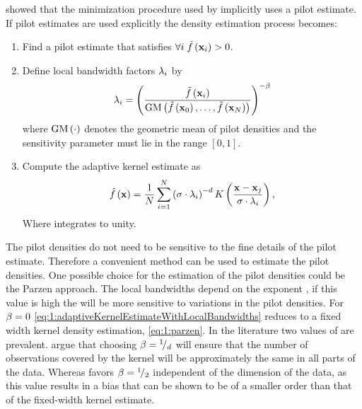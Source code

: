 	\textcite{silverman1986density} showed that the minimization procedure used by \citeauthor{breiman1977variable} implicitly uses a \KNN pilot estimate. If pilot estimates are used explicitly the density estimation process becomes:
		\begin{enumerate}[labelindent=0ex]
			\item Find a pilot estimate \varPilotDensityFunction{\varPattern} that satisfies $\forall i\; \varPilotDensityFunction{\varPattern[i]} > 0$. 

			\item Define local bandwidth factors $\lambda_{i}$ by
				\begin{equation}\label{eq:1:localBandwidth}
					\varLocalBandwidth{i} = \left( \frac{\varPilotDensityFunction{\varPattern[i]}}{\varGeometricMeanFunction{\varPilotDensityFunction{\varPattern[0]}, \dotsc, \varPilotDensityFunction{\varPattern[\varNumPatterns]}}}  \right)^{- \varMBESensitivityParam}
				\end{equation}
				where $\text{GM}\left(\cdot\right)$ denotes the geometric mean of pilot densities and the sensitivity parameter \varMBESensitivityParam must lie in the range $\left[0, 1\right]$.
			\item Compute the adaptive kernel estimate as
				\begin{equation}\label{eq:1:adaptiveKernelEstimateWithLocalBandwidths}
					\varEstimatedDensityFunction{\varPattern} = \frac{1}{\varNumPatterns} \sum_{i = 1}^{\varNumPatterns} \left(\varBandwidth \cdot \varLocalBandwidth{i}\right)^{-\varDim} \varKernel{\frac{\varPattern - \varPattern[j]}{\varBandwidth \cdot  \varLocalBandwidth{i}}},
				\end{equation}
				Where \varKernel{\cdot} integrates to unity. 
		\end{enumerate}
	The pilot densities do not need to be sensitive to the fine details of the pilot estimate. Therefore a convenient method can be used to estimate the pilot densities. One possible choice for the estimation of the pilot densities could be the Parzen approach. 
	The local bandwidths depend on the exponent \varMBESensitivityParam, if this value is high the \varLocalBandwidth{}will be more sensitive to variations in the pilot densities. For $\beta = 0$ \cref{eq:1:adaptiveKernelEstimateWithLocalBandwidths} reduces to a fixed width kernel density estimation, \ie \cref{eq:1:parzen}.
		In the literature two values of \varMBESensitivityParam are prevalent. \textcite{breiman1977variable} argue that choosing $\beta = {}^{1}\!/_{d}$ will ensure that the number of observations covered by the kernel will be approximately the same in all parts of the data. Whereas \citeauthor{silverman1986density} favors $\beta = {}^{1}\!/_{2}$ independent of the dimension of the data, as this value results in a bias that can be shown to be of a smaller order than that of the fixed-width kernel estimate.

